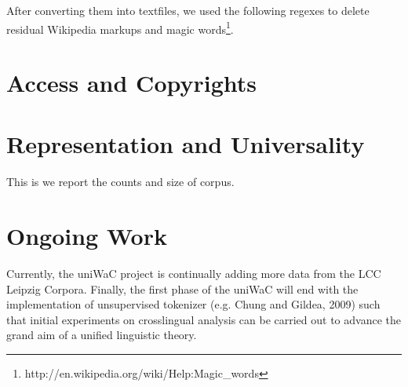 \documentclass[11pt]{article}
\begin{document}
After converting them into textfiles, we used the following regexes to delete residual Wikipedia markups and magic words\footnote{http://en.wikipedia.org/wiki/Help:Magic\_words}.

\section{Access and Copyrights}



\section{Representation and Universality}
This is we report the counts and size of corpus.



\section{Ongoing Work}

Currently, the uniWaC project is continually adding more data from the LCC Leipzig Corpora. Finally, the first phase of the uniWaC will end with the implementation of unsupervised tokenizer (e.g. Chung and Gildea, 2009) such that initial experiments on crosslingual analysis can be carried out to advance the grand aim of a unified linguistic theory.



\end{document}
